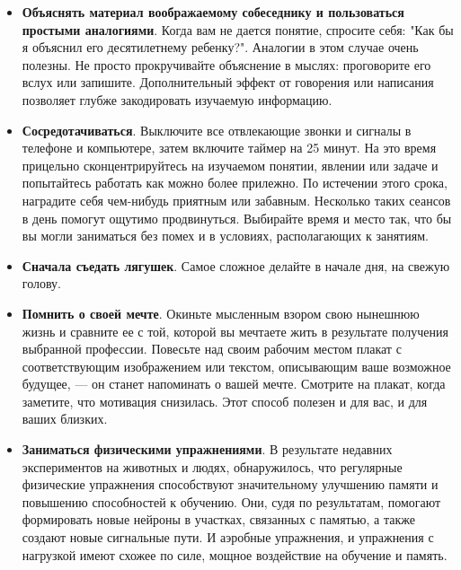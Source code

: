 \documentclass{article}
\begin{document}
\begin{itemize}
\item \textbf{Объяснять материал воображаемому собеседнику и пользоваться простыми аналогиями}. Когда вам не дается понятие, спросите себя: "Как бы я объяснил его десятилетнему ребенку?". Аналогии в этом случае очень полезны. Не просто прокручивайте объяснение в мыслях: проговорите его вслух или запишите. Дополнительный эффект от говорения или написания позволяет глубже закодировать изучаемую информацию.
\item \textbf{Сосредотачиваться}. Выключите все отвлекающие звонки и сигналы в телефоне и компьютере, затем включите таймер на 25 минут. На это время прицельно сконцентрируйтесь на изучаемом понятии, явлении или задаче и попытайтесь работать как можно более прилежно. По истечении этого срока, наградите себя чем-нибудь приятным или забавным. Несколько таких сеансов в день помогут ощутимо продвинуться. Выбирайте время и место так, что бы вы могли заниматься без помех и в условиях, располагающих к занятиям.
\item \textbf{Сначала съедать лягушек}. Самое сложное делайте в начале дня, на свежую голову.
\item \textbf{Помнить о своей мечте}. Окиньте мысленным взором свою нынешнюю жизнь и сравните ее с той, которой вы мечтаете жить в результате получения выбранной профессии. Повесьте над своим рабочим местом плакат с соответствующим изображением или текстом, описывающим ваше возможное будущее, --- он станет напоминать о вашей мечте. Смотрите на плакат, когда заметите, что мотивация снизилась. Этот способ полезен и для вас, и для ваших близких.
\item \textbf{Заниматься физическими упражнениями}. В результате недавних экспериментов на животных и людях, обнаружилось, что регулярные физические упражнения способствуют значительному улучшению памяти и повышению способностей к обучению. Они, судя по результатам, помогают формировать новые нейроны в участках, связанных с памятью, а также создают новые сигнальные пути. И аэробные упражнения, и упражнения с нагрузкой имеют схожее по силе, мощное воздействие на обучение и память.
\end{itemize}
\end{document}
